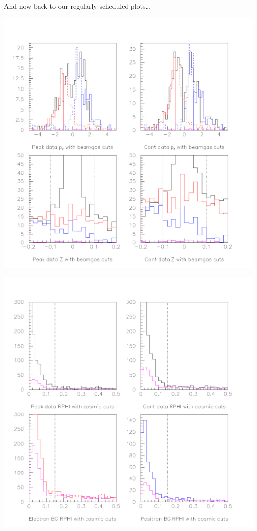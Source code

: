 \documentclass[landscape]{article}
\begin{document}
\pagebreak

\mbox{ }

\vfill

\begin{center}
\Huge And now back to our regularly-scheduled plots\ldots
\end{center}

\vfill

\pagebreak

\begin{center}
  \includegraphics[height=\textheight]{tr2_pctobgep.pdf}
\end{center}

\begin{center}
  \includegraphics[height=\textheight]{tr2_pcbgepcos.pdf}
\end{center}
\end{document}
